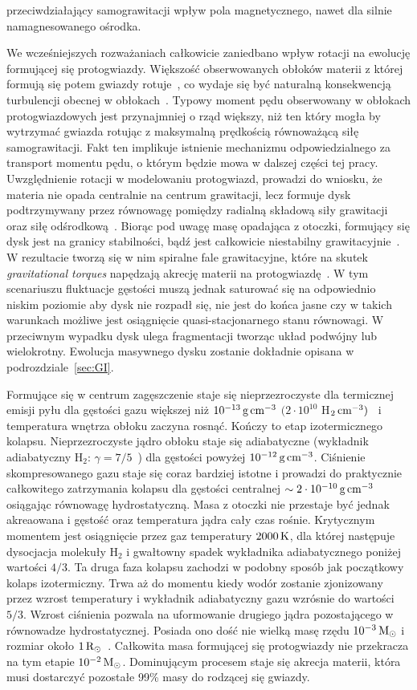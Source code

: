 przeciwdziałający samograwitacji wpływ pola magnetycznego, nawet dla silnie
namagnesowanego ośrodka.
\par We wcześniejszych rozważaniach całkowicie zaniedbano wpływ rotacji na
ewolucję formującej się protogwiazdy. Większość obserwowanych obłoków materii z
której formują się potem gwiazdy rotuje~\cite{GBFM93}, co wydaje się być
naturalną konsekwencją turbulencji obecnej w obłokach~\cite{BB00}. Typowy
moment pędu obserwowany w obłokach protogwiazdowych jest przynajmniej o rząd
większy, niż ten który mogła by wytrzymać gwiazda rotując z maksymalną
prędkością równoważącą siłę samograwitacji. Fakt ten implikuje istnienie
mechanizmu odpowiedzialnego za transport momentu pędu, o którym będzie mowa w
dalszej części tej pracy. Uwzględnienie rotacji w modelowaniu protogwiazd,
prowadzi do wniosku, że materia nie opada centralnie na centrum grawitacji, lecz
formuje dysk podtrzymywany przez równowagę pomiędzy radialną składową siły
grawitacji oraz siłę odśrodkową~\cite{TSC84}. Biorąc pod uwagę
masę opadająca z otoczki, formujący się dysk jest na granicy stabilności, bądź
jest całkowicie niestabilny grawitacyjnie~\cite{SKBT94}. W rezultacie tworzą
się w nim spiralne fale grawitacyjne, które na skutek \emph{gravitational
torques} napędzają akrecję materii na protogwiazdę~\cite{St00}. W tym
scenariuszu fluktuacje gęstości muszą jednak saturować się na odpowiednio niskim
poziomie aby dysk nie rozpadł się, nie jest do końca jasne czy w takich
warunkach możliwe jest osiągnięcie quasi-stacjonarnego stanu równowagi. W
przeciwnym wypadku dysk ulega fragmentacji tworząc układ podwójny lub
wielokrotny. Ewolucja masywnego dysku zostanie dokładnie opisana w
podrozdziale~\ref{sec:GI}. 

\par Formujące się w centrum zagęszczenie staje się nieprzezroczyste dla
termicznej emisji pyłu dla gęstości gazu większej niż $10^{-13}\hbox{$\thinspace\textrm{g}$}\hbox{$\thinspace\textrm{cm}$}^{-3}$
$(2\cdot10^{10}$ H$_2\hbox{$\thinspace\textrm{cm}$}^{-3})$~\cite{L69} i temperatura wnętrza obłoku zaczyna
rosnąć. Kończy to etap izotermicznego kolapsu. Nieprzezroczyste jądro obłoku
staje się adiabatyczne (wykładnik adiabatyczny H$_2$: $\gamma = 7/5$~\cite{L69})
dla gęstości powyżej $10^{-12}\hbox{$\thinspace\textrm{g}$}\hbox{$\thinspace\textrm{cm}$}^{-3}$. Ciśnienie skompresowanego gazu staje
się coraz bardziej istotne i prowadzi do praktycznie całkowitego zatrzymania
kolapsu dla gęstości centralnej $\sim 2\cdot 10^{-10}\hbox{$\thinspace\textrm{g}$}\hbox{$\thinspace\textrm{cm}$}^{-3}$ osiągając
równowagę hydrostatyczną. Masa z otoczki nie przestaje być jednak akreaowana i
gęstość oraz temperatura jądra cały czas rośnie. Krytycznym momentem jest
osiągnięcie przez gaz temperatury $2000\hbox{$\thinspace\textrm{K}$}$, dla której następuje dysocjacja
molekuły H$_2$ i gwałtowny spadek wykładnika adiabatycznego poniżej wartości
$4/3$. Ta druga faza kolapsu zachodzi w podobny sposób jak początkowy
kolaps izotermiczny. Trwa aż do momentu kiedy wodór zostanie zjonizowany przez
wzrost temperatury i wykładnik adiabatyczny gazu wzrósnie do wartości $5/3$.
Wzrost ciśnienia pozwala na uformowanie drugiego jądra pozostającego w
równowadze hydrostatycznej. Posiada ono dość nie wielką masę rzędu
$10^{-3}\hbox{$\mathrm{\thinspace M_{\odot}}$}$ i rozmiar około $1\hbox{$\mathrm{\thinspace R_{\odot}}$}$~\cite{MI00}. Całkowita masa formującej
się protogwiazdy nie przekracza na tym etapie $10^{-2}\hbox{$\mathrm{\thinspace M_{\odot}}$}$. Dominującym
procesem staje się akrecja materii, która musi dostarczyć pozostałe 99\% masy do
rodzącej się gwiazdy. 

